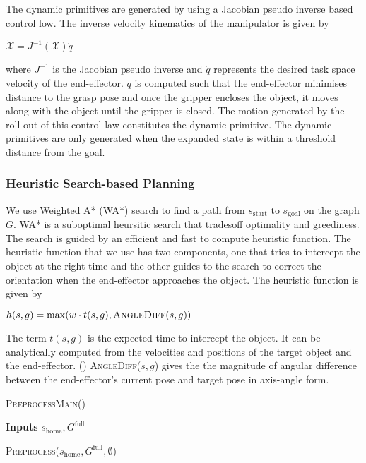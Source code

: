 {The dynamic primitives are generated by using a Jacobian pseudo inverse based control low. The inverse velocity kinematics of the manipulator is given by
\begin{center}
$\dot{\mathcal{X}} = J^{-1}(\mathcal{X})\dot{q}$
\end{center}

where $J^{-1}$ is the Jacobian pseudo inverse and $\dot{q}$ represents the desired task space velocity of the end-effector. $\dot{q}$ is computed such that the end-effector minimises distance to the grasp pose and once the gripper encloses the object, it moves along with the object until the gripper is closed. The motion generated by the roll out of this control law constitutes the dynamic primitive. The dynamic primitives are only generated when the expanded state is within a threshold distance from the goal. 

\subsubsection{Heuristic Search-based Planning}
We use Weighted A* (WA*) search to find a path from $s_{\textrm{start}}$ to $s_{\textrm{goal}}$ on the graph $G$. WA* is a suboptimal heursitic search that tradesoff optimality and greediness. The search is guided by an efficient and fast to compute heuristic function. The heuristic function that we use has two components, one that tries to intercept the object at the right time and the other guides to the search to correct the orientation when the end-effector approaches the object. The heuristic function is given by

\begin{center}
$h(s,g) = \max (w \cdot t(s,g), \textsc{AngleDiff}(s,g))$
\end{center}


The term $t(s,g)$ is the expected time to intercept the object. It can be analytically computed from the velocities and positions of the target object and the end-effector.
()
\textsc{AngleDiff}($s,g$) gives the the magnitude of angular difference between the end-effector's current pose and target pose in axis-angle form.

\begin{algorithm}
\caption{\textsc{PreprocessMain()}}\label{alg:1}
\hspace*{\algorithmicindent} \textbf{Inputs} $s_{\textrm{home}}, G^{\textrm{full}}$ \\
\begin{algorithmic}[1]
\State \textsc{Preprocess}($s_{\textrm{home}},G^{\textrm{full}},\emptyset$)
\end{algorithmic}
\end{algorithm}

}
